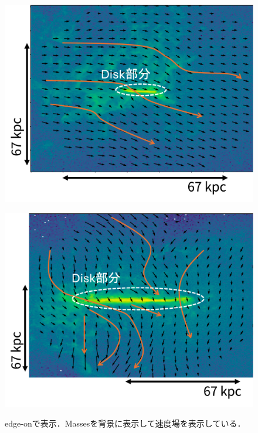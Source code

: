 \documentclass[main.tex]{subfiles}
\begin{document}
	\begin{figure}[htbp]
		\centering
		\begin{minipage}[b]{0.45\linewidth}
			\centering
			\includegraphics[width=\linewidth]{pic/outflow_subhalo388544}
			\label{fig:outflowsubhalo388544}
		\end{minipage}
		\begin{minipage}[b]{0.45\linewidth}
			\centering
			\includegraphics[width=\linewidth]{pic/outflow_subhalo421555}
			\label{fig:outflowsubhalo421555}
		\end{minipage}
		\captionsetup{width=.9\linewidth}
		\caption{edge-onで表示．Massesを背景に表示して速度場を表示している．}
		\label{fig:outflowsubhalo}
	\end{figure}
	
\end{document}
